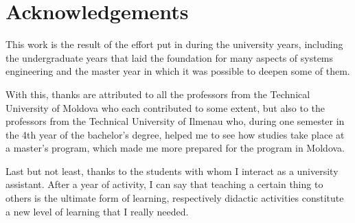 \chapter*{\centering Acknowledgements}
\thispagestyle{empty}
\par This work is the result of the effort put in during the university years, including the undergraduate years that laid the foundation for many aspects of systems engineering and the master year in which it was possible to deepen some of them.
\par With this, thanks are attributed to all the professors from the Technical University of Moldova who each contributed to some extent, but also to the professors from the Technical University of Ilmenau who, during one semester in the 4th year of the bachelor's degree, helped me to see how studies take place at a master's program, which made me more prepared for the program in Moldova.
\par Last but not least, thanks to the students with whom I interact as a university assistant. After a year of activity, I can say that teaching a certain thing to others is the ultimate form of learning, respectively didactic activities constitute a new level of learning that I really needed.